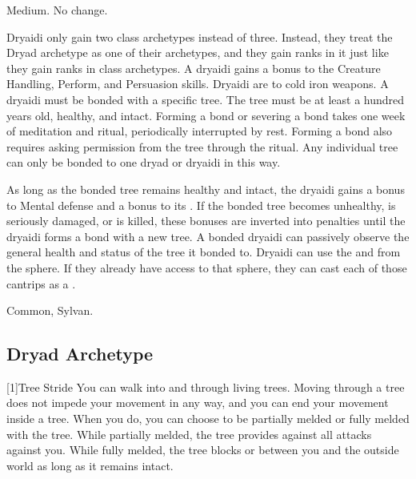    Medium.
   No change.
  \begin{itemize}
     Dryaidi only gain two class archetypes instead of three.
      Instead, they treat the Dryad archetype as one of their archetypes, and they gain ranks in it just like they gain ranks in class archetypes.
     A dryaidi gains a  bonus to the Creature Handling, Perform, and Persuasion skills.
     Dryaidi are \vulnerable to cold iron weapons.
     A dryaidi must be bonded with a specific tree.
      The tree must be at least a hundred years old, healthy, and intact.
      Forming a bond or severing a bond takes one week of meditation and ritual, periodically interrupted by rest.
      Forming a bond also requires asking permission from the tree through the ritual.
      Any individual tree can only be bonded to one dryad or dryaidi in this way.

      As long as the bonded tree remains healthy and intact, the dryaidi gains a  bonus to Mental defense and a  bonus to its .
      If the bonded tree becomes unhealthy, is seriously damaged, or is killed, these bonuses are inverted into penalties until the dryaidi forms a bond with a new tree.
      A bonded dryaidi can passively observe the general health and status of the tree it bonded to.
     Dryaidi can use the  and   from the  sphere.
      If they already have access to that sphere, they can cast each of those cantrips as a .
  \end{itemize}
   Common, Sylvan.

  \subsection{Dryad Archetype}

    [1]{Tree Stride} You can walk into and through living trees.
      Moving through a tree does not impede your movement in any way, and you can end your movement inside a tree.
      When you do, you can choose to be partially melded or fully melded with the tree.
      While partially melded, the tree provides  against all attacks against you.
      While fully melded, the tree blocks  or  between you and the outside world as long as it remains intact.

